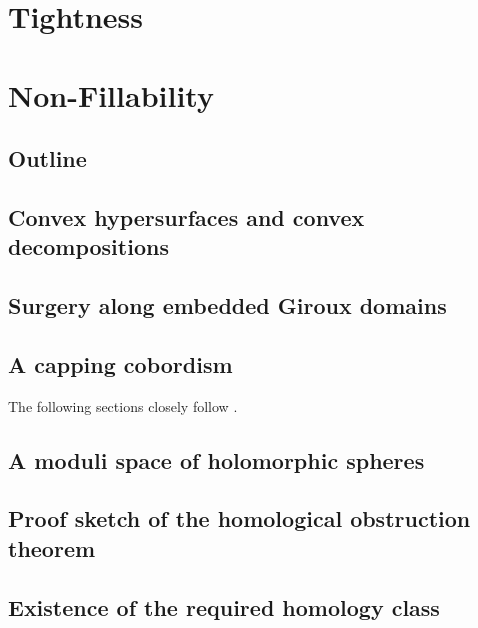 \documentclass[oneside]{amsbook}
\begin{document}
\chapter{Tightness}\label{chap:tightness}


\chapter{Non-Fillability}\label{chap:nonfillable}
\section{Outline}

\section{Convex hypersurfaces and convex decompositions}\label{sec:convex_decomposition}

\section{Surgery along embedded Giroux domains}

\section{A capping cobordism}
The following sections closely follow \cite[Section 6]{BGM22}.

\section{A moduli space of holomorphic spheres}

\section{Proof sketch of the homological obstruction theorem}\label{sec:proof_hom_obstr}

\section{Existence of the required homology class}\label{sec:homology_class}



\end{document}
